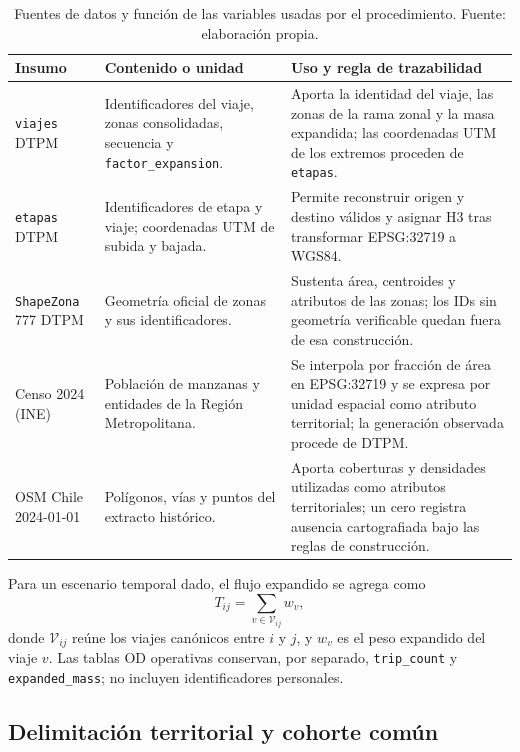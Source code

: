 \begin{table}[htbp]
\centering
\small
\caption{Fuentes de datos y función de las variables usadas por el procedimiento. Fuente: elaboración propia.}
\label{tab:fuentes_variables}
\begin{tabularx}{\textwidth}{@{}p{2.3cm}p{4.1cm}X@{}}
\toprule
\textbf{Insumo} & \textbf{Contenido o unidad} & \textbf{Uso y regla de trazabilidad} \\
\midrule
\texttt{viajes} DTPM & Identificadores del viaje, zonas consolidadas, secuencia y \texttt{factor\_expansion}. & Aporta la identidad del viaje, las zonas de la rama zonal y la masa expandida; las coordenadas UTM de los extremos proceden de \texttt{etapas}. \\
\texttt{etapas} DTPM & Identificadores de etapa y viaje; coordenadas UTM de subida y bajada. & Permite reconstruir origen y destino válidos y asignar H3 tras transformar EPSG:32719 a WGS84. \\
\texttt{ShapeZona} 777 DTPM & Geometría oficial de zonas y sus identificadores. & Sustenta área, centroides y atributos de las zonas; los IDs sin geometría verificable quedan fuera de esa construcción. \\
Censo 2024 (INE) & Población de manzanas y entidades de la Región Metropolitana. & Se interpola por fracción de área en EPSG:32719 y se expresa por unidad espacial como atributo territorial; la generación observada procede de DTPM. \\
OSM Chile 2024-01-01 & Polígonos, vías y puntos del extracto histórico. & Aporta coberturas y densidades utilizadas como atributos territoriales; un cero registra ausencia cartografiada bajo las reglas de construcción. \\
\bottomrule
\end{tabularx}
\end{table}

Para un escenario temporal dado, el flujo expandido se agrega como
\begin{equation}
    T_{ij} = \sum_{v \in \mathcal{V}_{ij}} w_v,
    \label{eq:flujo_expandido}
\end{equation}
donde $\mathcal{V}_{ij}$ reúne los viajes canónicos entre $i$ y $j$, y $w_v$ es el peso expandido del viaje $v$. Las tablas OD operativas conservan, por separado, \texttt{trip\_count} y \texttt{expanded\_mass}; no incluyen identificadores personales.

\subsection{Delimitación territorial y cohorte común}
\label{sec:delimitacion}

